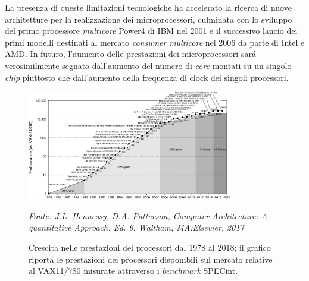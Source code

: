 La presenza di queste limitazioni tecnologiche ha accelerato la ricerca di nuove architetture per la realizzazione dei microprocessori, culminata con lo sviluppo del primo processore \textit{multicore} Power4 di IBM nel 2001 e il successivo lancio dei primi modelli destinati al mercato \textit{consumer} \textit{multicore} nel 2006 da parte di Intel e AMD.\newline
In futuro, l'aumento delle prestazioni dei microprocessori sar\'a verosimilmente segnato dall'aumento del numero di \textit{core} montati su un singolo \textit{chip} piuttosto che dall'aumento della frequenza di clock dei singoli processori.

\begin{figure}[h]
    \centering
    \includegraphics[width=0.8\textwidth]{../Immagini/Capitolo 1/PrestazioniProcessori}
    \caption{Crescita nelle prestazioni dei processori dal 1978 al 2018; il grafico riporta le prestazioni dei processori disponibili sul mercato relative al VAX11/780 misurate attraverso i \textit{benchmark} SPECint.}
    \label{fig:PrestazioniProcessori}
    \par\small{\textit{Fonte: J.L. Hennessy, D.A. Patterson, Computer Architecture: A quantitative Approach. Ed. 6. Waltham, MA:Elsevier, 2017}}
\end{figure}